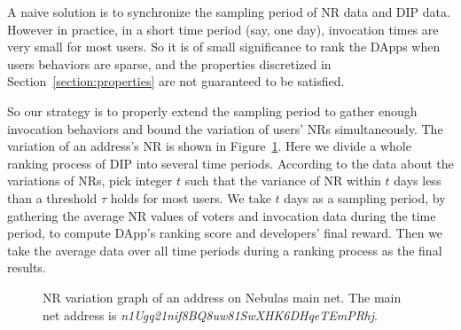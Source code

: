   A naive solution is to synchronize the sampling period of NR data and DIP data. However in practice, in a short time period (say, one day),  invocation times are very small for most users. So it is of small significance to rank the DApps when users behaviors are sparse, and the properties discretized  in Section~\ref{section:properties} are not guaranteed to be satisfied.

  So our strategy is to properly extend the sampling period to gather enough invocation behaviors and bound the variation of users' NRs simultaneously. The variation of  an address's NR is shown in Figure~\ref{fig:nr}. Here we divide a whole ranking process of DIP into several time periods. According to the data about the variations of NRs, pick integer $t$ such that the variance of NR within $t$ days less than a threshold $\tau$ holds for most users. We take $t$ days as a sampling period, by gathering the average NR values of voters and invocation data during the time period, to compute DApp's ranking score and developers' final reward. Then we take the average data over all time periods during a ranking process as the final  results.

  \begin{figure}
  	\label{fig:nr}
  	\centering
  	
  	\caption{NR variation graph of an address on Nebulas main net. The main net address is \textit{n1Ugq21nif8BQ8uw81SwXHK6DHqeTEmPRhj}.}
  \end{figure}
